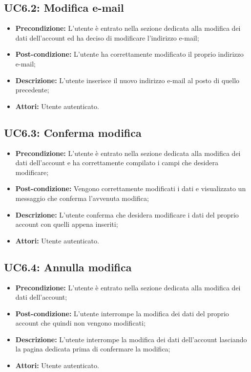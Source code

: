 \subsection{ UC6.2: Modifica e-mail}

\begin{itemize}
	\item \textbf{Precondizione:} L’utente è entrato nella sezione dedicata alla modifica dei dati dell’account ed ha deciso di modificare l’indirizzo e-mail;
	\item \textbf{Post-condizione:} L’utente ha correttamente modificato il proprio indirizzo e-mail;
	\item \textbf{Descrizione:} L’utente inserisce il nuovo indirizzo e-mail al posto di quello precedente;
	\item \textbf{Attori:} Utente autenticato.
\end{itemize}
\subsection{ UC6.3: Conferma modifica}

\begin{itemize}
	\item \textbf{Precondizione:} L’utente è entrato nella sezione dedicata alla modifica dei dati dell’account e ha correttamente compilato i campi che desidera modificare;
	\item \textbf{Post-condizione:} Vengono correttamente modificati i dati e visualizzato un messaggio che conferma l’avvenuta modifica;
	\item \textbf{Descrizione:} L’utente conferma che desidera modificare i dati del proprio account con quelli appena inseriti;
	\item \textbf{Attori:} Utente autenticato.
\end{itemize}
\subsection{ UC6.4: Annulla modifica}

\begin{itemize}
	\item \textbf{Precondizione:} L’utente è entrato nella sezione dedicata alla modifica dei dati dell’account;
	\item \textbf{Post-condizione:} L’utente interrompe la modifica dei dati del proprio account che quindi non vengono modificati;
	\item \textbf{Descrizione:} L’utente interrompe la modifica dei dati dell’account lasciando la pagina dedicata prima di confermare la modifica;
	\item \textbf{Attori:} Utente autenticato.
\end{itemize}
